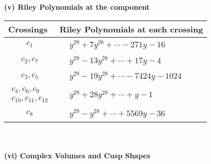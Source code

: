 \documentclass[1p]{elsarticle_modified}
\theoremstyle{definition}
\begin{document}
\newpage\renewcommand{\arraystretch}{1}
\flushleft \textbf{(v) Riley Polynomials at the component}\newline \\
\begin{tabular}{m{50pt}|m{274pt}}
Crossings & \hspace{64pt}Riley Polynomials at each crossing \\
\hline $$\begin{aligned}c_{1}\end{aligned}$$&$\begin{aligned}
&y^{29}+7 y^{28}+\cdots-271 y-16
\end{aligned}$\\
\hline $$\begin{aligned}c_{2},c_{7}\end{aligned}$$&$\begin{aligned}
&y^{29}-13 y^{28}+\cdots+17 y-4
\end{aligned}$\\
\hline $$\begin{aligned}c_{3},c_{5}\end{aligned}$$&$\begin{aligned}
&y^{29}-19 y^{28}+\cdots-7424 y-1024
\end{aligned}$\\
\hline $$\begin{aligned}c_{4},c_{6},c_{9}\\c_{10},c_{11},c_{12}\end{aligned}$$&$\begin{aligned}
&y^{29}+28 y^{28}+\cdots+y-1
\end{aligned}$\\
\hline $$\begin{aligned}c_{8}\end{aligned}$$&$\begin{aligned}
&y^{29}- y^{28}+\cdots+5569 y-36
\end{aligned}$\\
\hline
\end{tabular}\\~\\
\newpage\flushleft \textbf{(vi) Complex Volumes and Cusp Shapes}
\end{document}
